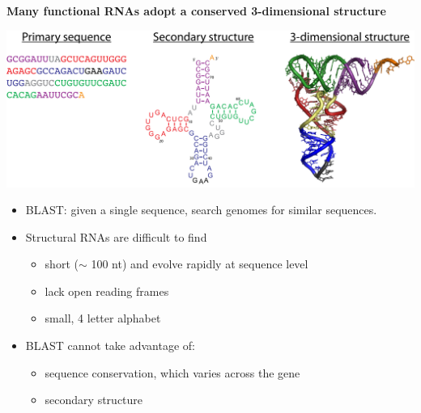 \documentclass[landscape]{slides}
\begin{document}
\begin{slide}
\begin{center}
{\bf Many functional RNAs adopt a conserved 3-dimensional 
  structure}
\medskip


\includegraphics[width=9in]{figs/trna-123}
\end{center}

\small
\begin{itemize}
\item
  BLAST: given a single sequence, search genomes for similar sequences.
\item
  Structural RNAs are difficult to find
  \begin{itemize}
  \item short ($\sim$ 100 nt) and evolve rapidly at sequence level
  \item lack open reading frames
  \item small, 4 letter alphabet 
  \end{itemize}
  \item
  BLAST cannot take advantage of:
\begin{itemize}
  \item sequence conservation, which varies across the gene
  \item secondary structure
\end{itemize}
\end{itemize}

\vfill

\end{slide}
\end{document}

